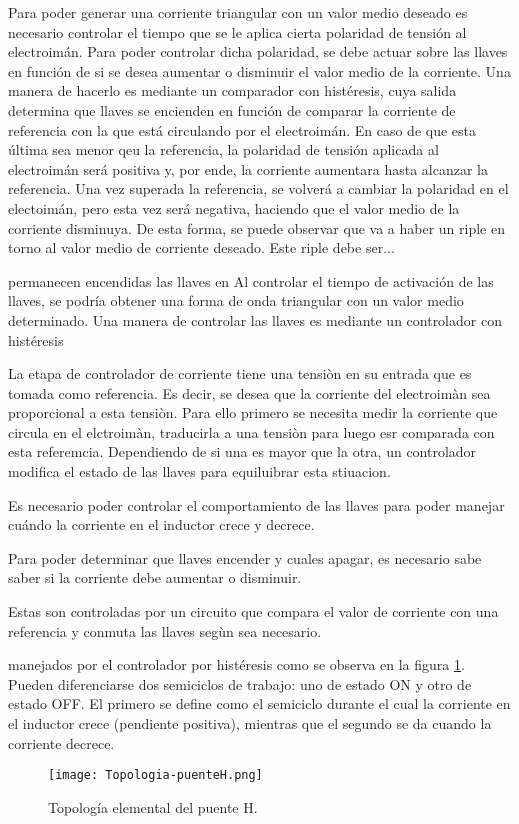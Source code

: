 Para poder generar una corriente triangular con un valor medio deseado es necesario controlar el tiempo que se le aplica cierta polaridad de tensión al electroimán. Para poder controlar dicha polaridad, se debe actuar sobre las llaves en función de si se desea aumentar o disminuir el valor medio de la corriente.  Una manera de hacerlo es mediante un comparador con histéresis, cuya salida determina que llaves se encienden en función de comparar la corriente de referencia con la que está circulando por el electroimán. En caso de que esta última sea menor qeu la referencia, la polaridad de tensión aplicada al electroimán será positiva y, por ende, la corriente aumentara hasta alcanzar la referencia. Una vez superada la referencia, se volverá a cambiar la polaridad en el electoimán, pero esta vez será negativa, haciendo que el valor medio de la corriente disminuya. De esta forma, se puede observar que va a haber un riple en torno al valor medio de corriente deseado.  Este riple debe ser...



permanecen encendidas las llaves en 
Al controlar el tiempo de activación de las llaves, se podría obtener una forma de onda triangular con un valor medio determinado. Una manera de controlar las llaves es mediante un controlador con histéresis

La etapa de controlador de corriente tiene una tensiòn en su entrada que es tomada como referencia. Es decir, se desea que la corriente del electroimàn sea proporcional a esta tensiòn. Para ello primero se necesita medir la corriente que circula en el elctroimàn, traducirla a una tensiòn para luego esr comparada con esta referemcia. Dependiendo de si una es mayor que la otra, un controlador modifica el estado de las llaves para equiluibrar esta stiuacion. 

Es necesario poder controlar el comportamiento de las llaves para poder manejar cuándo la corriente en el inductor crece y decrece. 

Para poder determinar que llaves encender y cuales apagar, es necesario sabe saber si la corriente debe aumentar o disminuir.

Estas son controladas por un circuito que compara el valor de corriente con una referencia y conmuta las llaves segùn sea necesario.

 manejados por el controlador por histéresis como se observa en la figura \ref{fig:img_topologia-puenteH}. Pueden diferenciarse dos semiciclos de trabajo: uno de estado ON y otro de estado OFF. El primero se define como el semiciclo durante el cual la corriente en el inductor crece (pendiente positiva), mientras que el segundo se da cuando la corriente decrece.

\begin{figure}[H]
	\centering
	\texttt{[image: Topologia-puenteH.png]}
	\caption{Topología elemental del puente H.}
	\label{fig:img_topologia-puenteH}
\end{figure}
